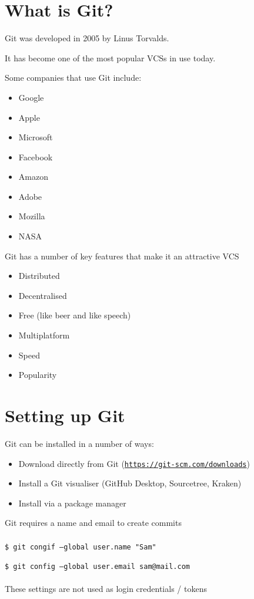 \documentclass{beamer}
\begin{document}
\section{What is Git?}
\begin{frame}[allowframebreaks]{\secname}
    Git was developed in 2005 by Linus Torvalds.
    
    It has become one of the most popular VCSs in use today.

    Some companies that use Git include:
    \begin{itemize}
    \item Google
    \item Apple
    \item Microsoft
    \item Facebook
    \item Amazon
    \item Adobe
    \item Mozilla
    \item NASA
    \end{itemize}

\framebreak

    Git has a number of key features that make it an attractive VCS
    \begin{itemize}
    \item Distributed
    \item Decentralised
    \item Free (like beer and like speech)
    \item Multiplatform
    \item Speed
    \item Popularity
    \end{itemize}

\end{frame}


\section{Setting up Git}
\begin{frame}[allowframebreaks]{\secname}
    Git can be installed in a number of ways:
    \begin{itemize}
    \item Download directly from Git ({\tt \url{https://git-scm.com/downloads}}) 
    \item Install a Git visualiser (GitHub Desktop, Sourcetree, Kraken)
    \item Install via a package manager 
    \end{itemize}

\framebreak

    Git requires a name and email to create commits \\~\\

    {\tt \$ git congif --global user.name "Sam"}

    {\tt \$ git config --global user.email sam@mail.com} \\~\\

    These settings are not used as login credentials / tokens

\end{frame}
\end{document}
